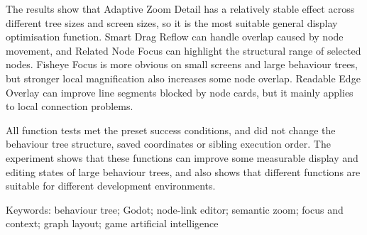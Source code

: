The results show that Adaptive Zoom Detail has a relatively stable effect across different tree sizes and screen sizes, so it is the most suitable general display optimisation function. Smart Drag Reflow can handle overlap caused by node movement, and Related Node Focus can highlight the structural range of selected nodes. Fisheye Focus is more obvious on small screens and large behaviour trees, but stronger local magnification also increases some node overlap. Readable Edge Overlay can improve line segments blocked by node cards, but it mainly applies to local connection problems.

All function tests met the preset success conditions, and did not change the behaviour tree structure, saved coordinates or sibling execution order. The experiment shows that these functions can improve some measurable display and editing states of large behaviour trees, and also shows that different functions are suitable for different development environments.

Keywords: behaviour tree; Godot; node-link editor; semantic zoom; focus and context; graph layout; game artificial intelligence

\mainmatter

